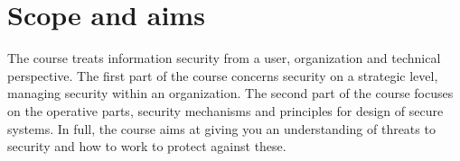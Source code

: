 \mode*

\section{Scope and aims}%
\label{sec:aim}


The course treats information security from a user, organization and technical 
perspective.
The first part of the course concerns security on a strategic level, \ie 
managing security within an organization.
The second part of the course focuses on the operative parts, \ie security 
mechanisms and principles for design of secure systems.
In full, the course aims at giving you an understanding of threats to security 
and how to work to protect against these.


